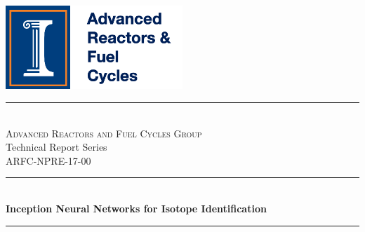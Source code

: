 \documentclass[11pt]{article}
\begin{document}

\begin{titlepage} %
	\newcommand{\HRule}{\rule{\linewidth}{0.5mm}} %
	
	\center %
	
	
	\vfill\vfill
	\includegraphics[width=0.5\textwidth]{logo.png} %
	 
	
	
        \vspace{1cm}
	\HRule\\[0.4cm]
        \textsc{\Large Advanced Reactors and Fuel Cycles Group}\\
        {\Large Technical Report Series}\\ %
	
	{\large ARFC-NPRE-17-00}\\ %

	
	
	\HRule\\[0.4cm]
	
	{\huge\bfseries Inception Neural Networks for Isotope Identification}\\[0.4cm] %
	
	\HRule\\[1.5cm]
	

\end{titlepage}
\end{document}
